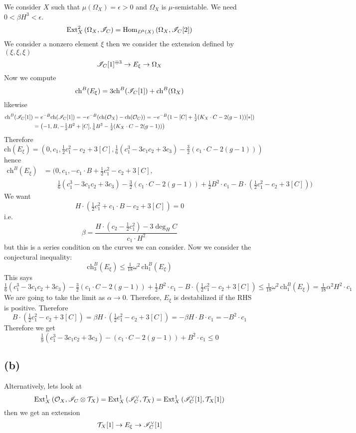 \documentclass[12pt]{article}
\renewcommand{\ch}{\mathrm{ch}}
\begin{document}
We consider $X$ such that $\mu(\Omega_X) = \epsilon > 0$ and $\Omega_X$ is $\mu$-semistable. We need $0 < \beta H^3 < \epsilon$.  
\[ \mathrm{Ext}^{2}_{X} \left( \Omega_X, \mathscr{I}_C \right) = \mathrm{Hom}_{D^b(X)} \left( \Omega_X, \mathscr{I}_C[2] \right) \]
We consider a nonzero element $\xi$ then we consider the extension defined by $(\xi, \xi, \xi)$
\[ \mathscr{I}_C[1]^{\oplus 3} \to E_\xi \to \Omega_X \] 
Now we compute 
\[ \ch^B(E_\xi) = 3 \ch^B(\I_C[1]) + \ch^B(\Omega_X) \]
likewise
\begin{align*}
\ch^B(\I_C[1]) &= e^{-B} \ch(\I_C[1]) = -e^{-B} (\ch(\struct{X}) - \ch(\struct{C})) = - e^{-B} (1 - [C] + \tfrac{1}{2} (K_X \cdot C - 2(g-1))[*])
\\
& = \left( -1, B, - \tfrac{1}{2} B^2 + [C], \tfrac{1}{6} B^3 - \tfrac{1}{2}(K_X \cdot C - 2(g-1)) \right)
\end{align*}
Therefore
\[ \ch(E_\xi) = \left( 0, c_1, \tfrac{1}{2} c_1^2 - c_2 + 3 [C], \tfrac{1}{6} (c_1^3 - 3 c_1 c_2 + 3 c_3) - \tfrac{3}{2}(c_1 \cdot C - 2(g-1)) \right) \]
hence
\begin{align*}
\ch^B(E_{\xi}) & = \Big(0, c_1, - c_1 \cdot B + \tfrac{1}{2} c_1^2 - c_2 + 3[C],
\\
& \quad \quad \tfrac{1}{6}(c_1^3 - 3 c_1 c_2 + 3 c_3) - \tfrac{3}{2} (c_1 \cdot C - 2(g-1)) + \tfrac{1}{2} B^2 \cdot c_1 - B \cdot (\tfrac{1}{2} c_1^2 - c_2 + 3 [C]) \Big)
\end{align*}
We want 
\[ H \cdot \left( \tfrac{1}{2} c_1^2 + c_1 \cdot B - c_2 + 3[C] \right) = 0 \]
i.e.
\[ \beta = \frac{H \cdot (c_2 - \tfrac{1}{2} c_1^2) - 3 \deg_H{C}}{c_1 \cdot H^2} \] 
but this is a series condition on the curves we can consider. Now we consider the conjectural inequality:
\[ \ch_3^B(E_\xi) \le \tfrac{1}{18} \omega^2 \, \ch_1^B(E_\xi) \]
This says
\[ \tfrac{1}{6}(c_1^3 - 3 c_1 c_2 + 3 c_3) - \tfrac{3}{2} (c_1 \cdot C - 2(g-1)) + \tfrac{1}{2} B^2 \cdot c_1 - B \cdot (\tfrac{1}{2} c_1^2 - c_2 + 3 [C]) \le \tfrac{1}{18} \omega^2 \, \ch_1^B(E_\xi) = \tfrac{1}{18} \alpha^2 H^2 \cdot c_1 \]
We are going to take the limit as $\alpha \to 0$. Therefore, $E_\xi$ is destabilized if the RHS is positive. Therefore
\[ B \cdot (\tfrac{1}{2} c_1^2 - c_2 + 3 [C]) = \beta H \cdot (\tfrac{1}{2} c_1^2 - c_2 + 3 [C]) = - \beta H \cdot B \cdot c_1 = - B^2 \cdot c_1 \]
Therefore we get
\[ \tfrac{1}{9} (c_1^3 - 3 c_1 c_2 + 3 c_3) - (c_1 \cdot C - 2(g-1)) + B^2 \cdot c_1 \le 0 \]

\subsection{(b)}

Alternatively, lets look at
\[ \mathrm{Ext}^{1}_{X} \left( \mathcal{O}_{X}, \mathscr{I}_C \otimes \mathcal{T}_X \right) = \mathrm{Ext}^{1}_{X} \left( \mathscr{I}_C^\vee, \mathcal{T}_X \right) = \mathrm{Ext}^{1}_{X} \left( \mathscr{I}_C^\vee[1], \mathcal{T}_X[1] \right) \]
then we get an extension
\[ \mathcal{T}_X[1] \to E_\xi \to \mathscr{I}_C^\vee[1] \]
\end{document}
